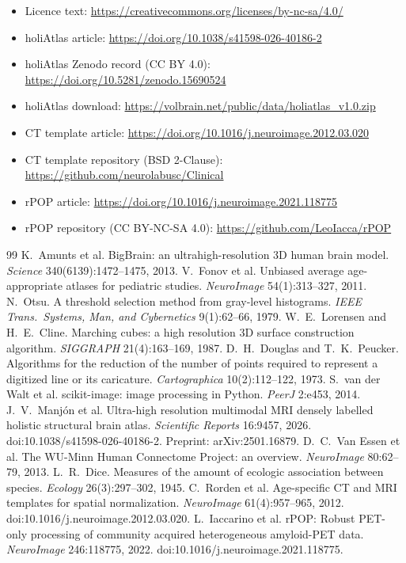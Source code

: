 \documentclass[10pt,a4paper]{article}
\begin{document}
\begin{itemize}
\item Licence text: \url{https://creativecommons.org/licenses/by-nc-sa/4.0/}
\item holiAtlas article: \url{https://doi.org/10.1038/s41598-026-40186-2}
\item holiAtlas Zenodo record (CC BY 4.0): \url{https://doi.org/10.5281/zenodo.15690524}
\item holiAtlas download: \url{https://volbrain.net/public/data/holiatlas_v1.0.zip}
\item CT template article: \url{https://doi.org/10.1016/j.neuroimage.2012.03.020}
\item CT template repository (BSD 2-Clause): \url{https://github.com/neurolabusc/Clinical}
\item rPOP article: \url{https://doi.org/10.1016/j.neuroimage.2021.118775}
\item rPOP repository (CC BY-NC-SA 4.0): \url{https://github.com/LeoIacca/rPOP}
\end{itemize}

\begin{thebibliography}{99}\small
{} K.~Amunts et al. BigBrain: an ultrahigh-resolution 3D human brain model. \emph{Science} 340(6139):1472--1475, 2013.
 V.~Fonov et al. Unbiased average age-appropriate atlases for pediatric studies. \emph{NeuroImage} 54(1):313--327, 2011.
 N.~Otsu. A threshold selection method from gray-level histograms. \emph{IEEE Trans.\ Systems, Man, and Cybernetics} 9(1):62--66, 1979.
 W.~E.~Lorensen and H.~E.~Cline. Marching cubes: a high resolution 3D surface construction algorithm. \emph{SIGGRAPH} 21(4):163--169, 1987.
 D.~H.~Douglas and T.~K.~Peucker. Algorithms for the reduction of the number of points required to represent a digitized line or its caricature. \emph{Cartographica} 10(2):112--122, 1973.
 S.~van der Walt et al. scikit-image: image processing in Python. \emph{PeerJ} 2:e453, 2014.
 J.~V.~Manj\'on et al. Ultra-high resolution multimodal MRI densely labelled holistic structural brain atlas. \emph{Scientific Reports} 16:9457, 2026. doi:10.1038/s41598-026-40186-2. Preprint: arXiv:2501.16879.
 D.~C.~Van Essen et al. The WU-Minn Human Connectome Project: an overview. \emph{NeuroImage} 80:62--79, 2013.
 L.~R.~Dice. Measures of the amount of ecologic association between species. \emph{Ecology} 26(3):297--302, 1945.
 C.~Rorden et al. Age-specific CT and MRI templates for spatial normalization. \emph{NeuroImage} 61(4):957--965, 2012. doi:10.1016/j.neuroimage.2012.03.020.
 L.~Iaccarino et al. rPOP: Robust PET-only processing of community acquired heterogeneous amyloid-PET data. \emph{NeuroImage} 246:118775, 2022. doi:10.1016/j.neuroimage.2021.118775.
\end{thebibliography}
\end{document}
